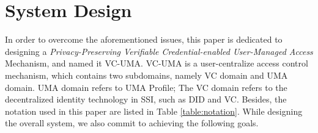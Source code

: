 \documentclass[conference, dvipdfmx]{IEEEtran} %
\begin{document}
\begin{sloppypar}
\section{System Design}
\label{sec:system_design}

In order to overcome the aforementioned issues, this paper is dedicated to designing a \textit{Privacy-Preserving Verifiable Credential-enabled User-Managed Access} Mechanism, and named it VC-UMA. VC-UMA is a user-centralize access control mechanism, which contains two subdomains, namely VC domain and UMA domain. UMA domain refers to UMA Profile\cite{UMA}; The VC domain refers to the decentralized identity technology in SSI, such as DID and VC. Besides, the notation used in this paper are listed in Table \ref{table:notation}. 
While designing the overall system, we also commit to achieving the following goals.

\begin{table}[ht]
  \begin{center}
  \caption{Notation}
  \label{table:notation}
  \end{center}
\end{table}



\end{sloppypar}
\end{document}
